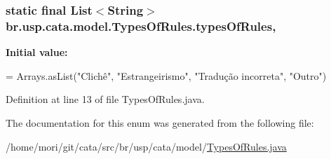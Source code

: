 \hypertarget{enumbr_1_1usp_1_1cata_1_1model_1_1_types_of_rules_abb1548f45b5db42b6e83c2145d519532}{
\subsubsection[{types\+Of\+Rules}]{\setlength{\rightskip}{0pt plus 5cm} static  final List$<$String$>$ br.\+usp.\+cata.\+model.\+Types\+Of\+Rules.\+types\+Of\+Rules\hspace{0.3cm}{\ttfamily [static]}, {\ttfamily [private]}}}\label{enumbr_1_1usp_1_1cata_1_1model_1_1_types_of_rules_abb1548f45b5db42b6e83c2145d519532}
{\bfseries Initial value\+:}
\begin{DoxyCode}
= 
        Arrays.asList(\textcolor{stringliteral}{"Clichê"}, \textcolor{stringliteral}{"Estrangeirismo"}, \textcolor{stringliteral}{"Tradução incorreta"}, \textcolor{stringliteral}{"Outro"})
\end{DoxyCode}


Definition at line 13 of file Types\+Of\+Rules.\+java.



The documentation for this enum was generated from the following file\+:\begin{DoxyCompactItemize}
\item 
/home/mori/git/cata/src/br/usp/cata/model/\hyperlink{_types_of_rules_8java}{Types\+Of\+Rules.\+java}\end{DoxyCompactItemize}
